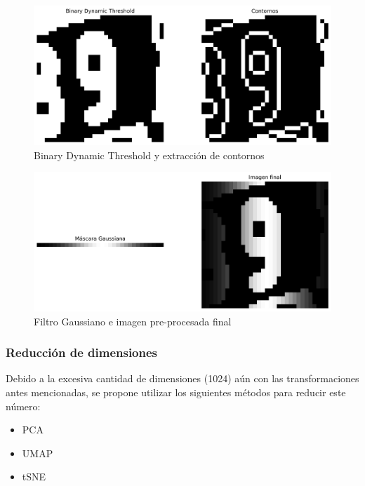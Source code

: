 \documentclass[journal]{IEEEtran}
\begin{document}
\begin{figure}[H]
        \centering
        \includegraphics[width=\linewidth]{figures/row_4_images.png}
        \caption{Binary Dynamic Threshold y extracción de contornos}
        \label{fig:row_4}
\end{figure}

\begin{figure}[H]
        \centering
        \includegraphics[width=\linewidth]{figures/row_5_images.png}
        \caption{Filtro Gaussiano e imagen pre-procesada final}
        \label{fig:row_5}
\end{figure}

\subsubsection{Reducción de dimensiones}

Debido a la excesiva cantidad de dimensiones (1024) aún con las transformaciones antes mencionadas, se propone utilizar los siguientes métodos para reducir este número:
\begin{itemize}
        \item PCA\cite{scikit-learn_pca}
        \item UMAP\cite{umap-learn}
        \item tSNE\cite{scikit-learn-tsne}
\end{itemize}
\end{document}
